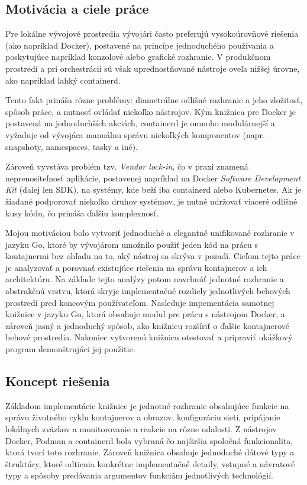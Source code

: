 \documentclass[
 program=infpvs,
  language=slovak,
  figures=false,
  tables=false,
  sourcecodes,
  glossaries,
  index
]{kidiplom}
\begin{document}
\subsection{Motivácia a ciele práce} \label{sec:motivacia}
Pre lokálne vývojové prostredia vývojári často preferujú vysokoúrovňové riešenia (ako napríklad Docker), postavené na princípe jednoduchého používania a poskytujúce napríklad konzolové alebo grafické rozhranie. V produkčnom prostredí a pri orchestrácii sú však uprednostňované nástroje oveľa nižšej úrovne, ako napríklad ľahký containerd.

Tento fakt prináša rôzne problémy: diametrálne odlišné rozhranie a jeho zložitosť, spôsob práce, a nutnosť ovládať niekoľko nástrojov. Kým knižnica pre Docker je postavená na jednoduchších akciách, containerd je omnoho modulárnejší a vyžaduje od vývojára manuálnu správu niekoľkých komponentov (napr. snapshoty, namespaces, tasky a iné).

Zároveň vyvstáva problém tzv. \textit{Vendor lock-in}, čo v praxi znamená neprenositeľnosť aplikácie, postavenej napríklad na Docker \textit{Software Development Kit} (ďalej len SDK), na systémy, kde beží iba containerd alebo Kubernetes. Ak je žiadané podporovať niekoľko druhov systémov, je nutné udržovať viaceré odlišné kusy kódu, čo prináša ďalšiu komplexnosť.

Mojou motiváciou bolo vytvoriť jednoduché a elegantné unifikované rozhranie v jazyku Go, ktoré by vývojárom umožnilo použiť jeden kód na prácu s kontajnermi bez ohľadu na to, aký nástroj sa skrýva v pozadí. Cieľom tejto práce je analyzovať a porovnať existujúce riešenia na správu kontajnerov a ich architektúru. Na základe tejto analýzy potom navrhnúť jednotné rozhranie a abstrakčnú vrstvu, ktorá skryje implementačné rozdiely jednotlivých behových prostredí pred koncovým používateľom. Nasleduje impementácia samotnej knižnice v jazyku Go, ktorá obsahuje modul pre prácu s nástrojom Docker, a zároveň jasný a jednoduchý spôsob, ako knižnicu rozšíriť o ďalšie kontajnerové behové prostredia. Nakoniec vytvorenú knižnicu otestovať a pripraviť ukážkový program demonštrujúci jej použitie.

\subsection{Koncept riešenia} \label{sec:koncept}
Základom implementácie knižnice je jednotné rozhranie obsahujúce funkcie na správu životného cyklu kontajnerov a obrazov, konfiguráciu sietí, pripájanie lokálnych zväzkov a monitorovanie a reakcie na rôzne udalosti. Z nástrojov Docker, Podman a containerd bola vybraná čo najširšia spoločná funkcionalita, ktorá tvorí toto rozhranie. Zároveň knižnica obsahuje jednoduché dátové typy a štruktúry, ktoré odtienia konkrétne implementačné detaily, vstupné a návratové typy a spôsoby predávania argumentov funkciám jednotlivých technológií. 
\end{document}
